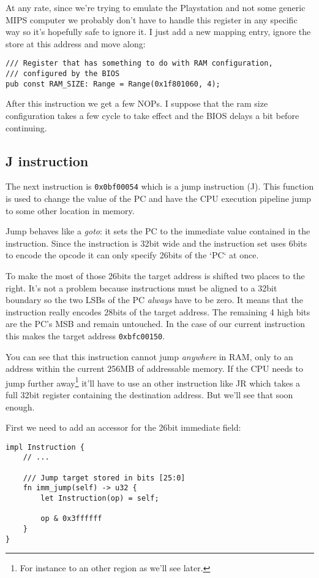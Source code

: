 \documentclass[a4paper]{article}
\newcommand{\code}[1] {\texttt{#1}}
\begin{document}
At any rate, since we're trying to emulate the Playstation and not
some generic MIPS computer we probably don't have to handle this
register in any specific way so it's hopefully safe to ignore it. I
just add a new mapping entry, ignore the store at this address and
move along:

\begin{lstlisting}
/// Register that has something to do with RAM configuration,
/// configured by the BIOS
pub const RAM_SIZE: Range = Range(0x1f801060, 4);
\end{lstlisting}

After this instruction we get a few NOPs. I suppose that the ram size
configuration takes a few cycle to take effect and the BIOS delays a
bit before continuing.

\subsection{J instruction}

The next instruction is \code{0x0bf00054} which is a jump
instruction (J). This function is used to change the value of the PC
and have the CPU execution pipeline jump to some other location in
memory.

Jump behaves like a \emph{goto}: it sets the PC to the immediate value
contained in the instruction. Since the instruction is 32bit wide and
the instruction set uses 6bits to encode the opcode it can only
specify 26bits of the `PC` at once.

To make the most of those 26bits the target address is shifted two
places to the right. It's not a problem because instructions must be
aligned to a 32bit boundary so the two LSBs of the PC \emph{always}
have to be zero. It means that the instruction really encodes 28bits
of the target address. The remaining 4 high bits are the PC's MSB and
remain untouched. In the case of our current instruction this makes
the target address \code{0xbfc00150}.

You can see that this instruction cannot jump \emph{anywhere} in RAM,
only to an address within the current 256MB of addressable memory. If
the CPU needs to jump further away\footnote{For instance to an other
  region as we'll see later.} it'll have to use an other instruction
like JR which takes a full 32bit register containing the destination
address. But we'll see that soon enough.

First we need to add an accessor for the 26bit immediate field:

\begin{lstlisting}
impl Instruction {
    // ...

    /// Jump target stored in bits [25:0]
    fn imm_jump(self) -> u32 {
        let Instruction(op) = self;

        op & 0x3ffffff
    }
}
\end{lstlisting}
\end{document}

